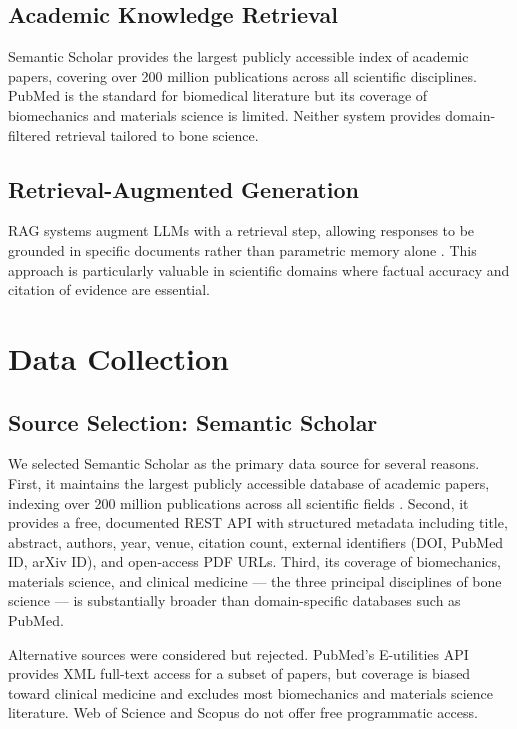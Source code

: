 \documentclass[12pt, a4paper]{article}
\begin{document}
\subsection{Academic Knowledge Retrieval}
Semantic Scholar \cite{semanticscholar} provides the largest publicly accessible
index of academic papers, covering over 200 million publications across all
scientific disciplines. PubMed \cite{pubmed} is the standard for biomedical
literature but its coverage of biomechanics and materials science is limited.
Neither system provides domain-filtered retrieval tailored to bone science.

\subsection{Retrieval-Augmented Generation}
RAG systems augment LLMs with a retrieval step, allowing responses to be grounded
in specific documents rather than parametric memory alone \cite{TODO}.
This approach is particularly valuable in scientific domains where factual accuracy
and citation of evidence are essential.

\section{Data Collection}
\label{sec:data}

\subsection{Source Selection: Semantic Scholar}

We selected Semantic Scholar \cite{semanticscholar} as the primary data source for
several reasons. First, it maintains the largest publicly accessible database of
academic papers, indexing over 200 million publications across all scientific
fields \cite{semanticscholar}. Second, it provides a free, documented REST API
with structured metadata including title, abstract, authors, year, venue, citation
count, external identifiers (DOI, PubMed ID, arXiv ID), and open-access PDF URLs.
Third, its coverage of biomechanics, materials science, and clinical medicine ---
the three principal disciplines of bone science --- is substantially broader than
domain-specific databases such as PubMed.

Alternative sources were considered but rejected. PubMed's E-utilities API provides
XML full-text access for a subset of papers, but coverage is biased toward clinical
medicine and excludes most biomechanics and materials science literature.
Web of Science and Scopus do not offer free programmatic access.
\end{document}
